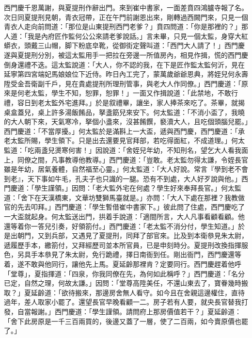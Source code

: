 西門慶千恩萬謝，與夏提刑作辭出門。來到崔中書家，一面差賁四鴻臚寺報了名。次日同夏提刑見朝，青衣冠帶，正在午門前謝恩出來，剛轉過西闕門來，只見一個青衣人走向前問道：「那位是山東提刑西門老爹？」賁四問道：「你是那裡的？」那人道：「我是內府匠作監何公公來請老爹說話。」言未畢，只見一個太監，身穿大紅蟒衣，頭戴三山帽，脚下粉底皁靴，從御街定聲叫道：「西門大人請了！」西門慶遂與夏提刑分別，被這太監用手一把拉在旁邊一所值房內，相見作揖，慌的西門慶倒身還禮不迭。這太監說道：「大人，你不認的我，在下是匠作監太監何沂，見在延寧第四宮端妃馬娘娘位下近侍。昨日內工完了，蒙萬歲爺爺恩典，將姪兒何永壽陞受金吾衛副千戶，見在貴處提刑所理刑管事，與老大人作同僚。」西門慶道：「原來是何老太監，學生不知，恕罪，恕罪！」一面又作揖說道：「此禁地，不敢行禮，容日到老太監外宅進拜。」於是叙禮畢，讓坐，家人捧茶來吃了。茶畢，就揭桌盒蓋兒，桌上許多湯飯餚品，拏盞筯兒來安下。何太監道：「不消小盃了，我曉的大人朝下來，天氣寒冷，拏個小盞來，沒甚餚饌，褻瀆大人，且吃個頭腦兒罷。」西門慶道：「不當厚擾。」何太監於是滿斟上一大盃，遞與西門慶，西門慶道：「承老太監所賜，學生領下。只是出去還要見官拜部，若吃得面紅，不成道理。」何太監道：「吃兩盞兒燙寒何害！」因說道：「舍姪兒年幼，不知刑名，望乞大人看我面上，同僚之間，凡事教導他教導。」西門慶道：「豈敢。老太監勿得太謙，令姪長官雖是年幼，居氣養體，自然福至心靈。」何太監道：「大人好說。常言『學到老不會到老』，天下事如牛毛，孔夫子也只識的一腿。{}恐有不到處，大人好歹說與他。」西門慶道：「學生謹領。」因問：「老大監外宅在何處？學生好來奉拜長官。」何太監道：「舍下在天漢橋東，文華坊雙獅馬臺就是。」亦問：「大人下處在那裡？我教做官的先去叩拜。」西門慶道：「學生暫借崔中書家下。」彼此問了住處，西門慶吃了一大盃就起身。何太監送出門，拱着手說道：「適間所言，大人凡事看顧看顧。他還等着你一答兒引奏，好領箚付。」西門慶道：「老太監不消分付，學生知道。」於是出朝門，又到兵部，又遇見了夏提刑，同拜了部官來。比及到本衛叅見朱太尉，遞履歷手本，繳箚付，又拜經歷司並本所官員，已是申刻時分。夏提刑改換指揮服色，另具手本叅見了朱太尉，免行跪禮，擇日南衙到任。剛出衙門，西門慶還等着，遂不敢與他同行，讓他先上馬。夏延齡那裡肯？定要同行。西門慶趕着他呼「堂尊」，夏指揮道：「四泉，你我同僚在先，為何如此稱呼？」西門慶道：「名分已定，自然之理，何故太謙。」因問：「堂尊高陞美任，不還山東去了，寶眷幾時搬取？」夏延齡道：「欲待搬來，那邊房舍無人看守。如今且在舍親這邊權住，直待過年，差人取家小罷了。還望長官早晚看顧一二。房子若有人要，就央長官替我打發，自當報謝。」西門慶道：「學生謹領。請問府上那房價值若干？」夏延齡道：「舍下此房原是一千三百兩買的，後邊又蓋了一層，使了二百兩，如今賣原價也罷了。」

